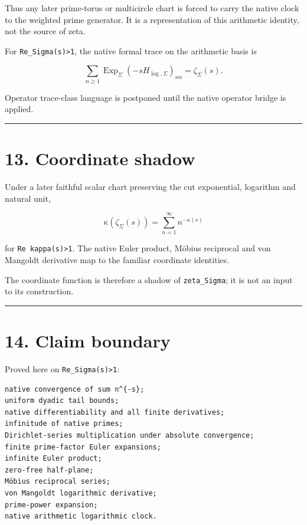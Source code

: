 Thus any later prime-torus or multicircle chart is forced to carry the native
clock to the weighted prime generator. It is a representation of this arithmetic
identity, not the source of zeta.

For \texttt{Re\_Sigma(s)\textgreater{}1}, the native formal trace on the arithmetic basis is

\[
\sum_{n\ge1}
\operatorname{Exp}_\Sigma
(-sH_{\log,\Sigma})_{nn}
=
\zeta_\Sigma(s).
\]

Operator trace-class language is postponed until the native operator bridge is
applied.

\begin{center}\rule{0.5\linewidth}{0.5pt}\end{center}

\hypertarget{coordinate-shadow}{%
\section{13. Coordinate shadow}\label{coordinate-shadow}}

Under a later faithful scalar chart preserving the cut exponential, logarithm
and natural unit,

\[
\kappa(\zeta_\Sigma(s))
=
\sum_{n=1}^{\infty}n^{-\kappa(s)}
\]

for \texttt{Re\ kappa(s)\textgreater{}1}. The native Euler product, Möbius reciprocal and von
Mangoldt derivative map to the familiar coordinate identities.

The coordinate function is therefore a shadow of \texttt{zeta\_Sigma}; it is not an
input to its construction.

\begin{center}\rule{0.5\linewidth}{0.5pt}\end{center}

\hypertarget{claim-boundary}{%
\section{14. Claim boundary}\label{claim-boundary}}

Proved here on \texttt{Re\_Sigma(s)\textgreater{}1}:

\begin{verbatim}
native convergence of sum n^{-s};
uniform dyadic tail bounds;
native differentiability and all finite derivatives;
infinitude of native primes;
Dirichlet-series multiplication under absolute convergence;
finite prime-factor Euler expansions;
infinite Euler product;
zero-free half-plane;
Möbius reciprocal series;
von Mangoldt logarithmic derivative;
prime-power expansion;
native arithmetic logarithmic clock.
\end{verbatim}

